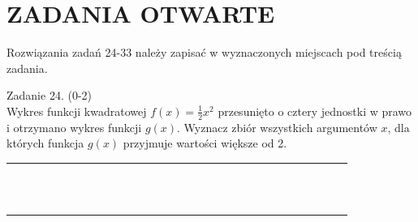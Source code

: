 \documentclass[10pt]{article}
\begin{document}
\section*{ZADANIA OTWARTE}
Rozwiązania zadań 24-33 należy zapisać w wyznaczonych miejscach pod treścią zadania.

Zadanie 24. (0-2)\\
Wykres funkcji kwadratowej \(f(x)=\frac{1}{2} x^{2}\) przesunięto o cztery jednostki w prawo i otrzymano wykres funkcji \(g(x)\). Wyznacz zbiór wszystkich argumentów \(x\), dla których funkcja \(g(x)\) przyjmuje wartości większe od 2.

\begin{center}
\begin{tabular}{|c|c|c|c|c|c|c|c|c|c|c|c|c|c|c|c|c|c|c|c|c|c|c|c|c|c|c|c|c|c|}
\hline
 &  &  &  &  &  &  &  &  &  &  &  &  &  &  &  &  &  &  &  &  &  &  &  &  &  &  &  &  &  \\
\hline
 &  &  &  &  &  &  &  &  &  &  &  &  &  &  &  &  &  &  &  &  &  &  &  &  &  &  &  &  &  \\
\hline
 &  &  &  &  &  &  &  &  &  &  &  &  &  &  &  &  &  &  &  &  &  &  &  &  &  &  &  &  &  \\
\hline
 &  &  &  &  &  &  &  &  &  &  &  &  &  &  &  &  &  &  &  &  &  &  &  &  &  &  &  &  &  \\
\hline
 &  &  &  &  &  &  &  &  &  &  &  &  &  &  &  &  &  &  &  &  &  &  &  &  &  &  &  &  &  \\
\hline
 &  &  &  &  &  &  &  &  &  &  &  &  &  &  &  &  &  &  &  &  &  &  &  &  &  &  &  &  &  \\
\hline
 &  &  &  &  &  &  &  &  &  &  &  &  &  &  &  &  &  &  &  &  &  &  &  &  &  &  &  &  &  \\
\hline
 &  &  &  &  &  &  &  &  &  &  &  &  &  &  &  &  &  &  &  &  &  &  &  &  &  &  &  &  &  \\
\hline
 &  &  &  &  &  &  &  &  &  &  &  &  &  &  &  &  &  &  &  &  &  &  &  &  &  &  &  &  &  \\
\hline
 &  &  &  &  &  &  &  &  &  &  &  &  &  &  &  &  &  &  &  &  &  &  &  &  &  &  &  &  &  \\
\hline
 &  &  &  &  &  &  &  &  &  &  &  &  &  &  &  &  &  &  &  &  &  &  &  &  &  &  &  &  &  \\
\hline
 &  &  &  &  &  &  &  &  &  &  &  &  &  &  &  &  &  &  &  &  &  &  &  &  &  &  &  &  &  \\
\hline
 &  &  &  &  &  &  &  &  &  &  &  &  &  &  &  &  &  &  &  &  &  &  &  &  &  &  &  &  &  \\

\end{tabular}
\end{center}
\end{document}
